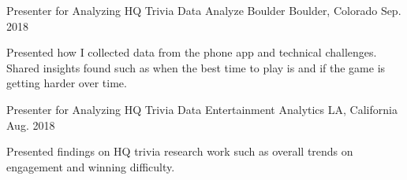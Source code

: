 

\begin{cventries}

  \cventry
    {Presenter for Analyzing HQ Trivia Data} %
    {Analyze Boulder} %
    {Boulder, Colorado} %
    {Sep. 2018} %
    {
      \begin{cvitems} %
        \item {Presented how I collected data from the phone app and technical challenges. Shared insights found such as when the best time to play is and if the game is getting harder over time.}
      \end{cvitems}
    }
    
  \cventry
    {Presenter for Analyzing HQ Trivia Data} %
    {Entertainment Analytics} %
    {LA, California} %
    {Aug. 2018} %
    {
      \begin{cvitems} %
        \item {Presented findings on HQ trivia research work such as overall trends on engagement and winning difficulty.}
      \end{cvitems}
    }

\end{cventries}
